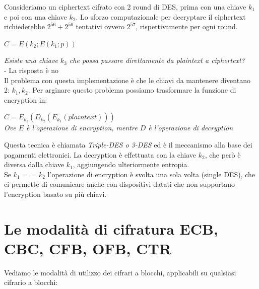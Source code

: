 \documentclass[11pt, oneside]{article}   	%
\begin{document}
Consideriamo un ciphertext cifrato con 2 round di DES, prima con una chiave $k_1$ e poi con una chiave $k_2$. Lo sforzo computazionale per decryptare il ciphertext richiederebbe $2^{56} + 2^{56}$ tentativi ovvero $2^{57}$, rispettivamente per ogni round.
\begin{center}
$C= E(k_2;E(k_1;p))$
\end{center}
\emph{Esiste una chiave $k_3$ che possa passare direttamente da plaintext a ciphertext?}\\
 - La risposta è no\\
 Il problema con questa implementazione è che le chiavi da mantenere diventano 2: $k_1, k_2$. Per arginare questo problema possiamo trasformare la funzione di encryption in:
 \begin{center}
 $C = E_{k_1}(D_{k_2}(E_{k_1}(plaintext)))$\\
 \emph{Ove $E$ è l'operazione di encryption, mentre $D$ è l'operazione di decryption}
 \end{center}
 Questa tecnica è chiamata \emph{Triple-DES o 3-DES} ed è il meccanismo alla base dei pagamenti elettronici. La decryption è effettuata con la chiave $k_2$, che però è diversa dalla chiave $k_1$, aggiungendo ulteriormente entropia.\\Se $k_1 == k_2$ l'operazione di encryption è svolta una sola volta (single DES), che ci permette di comunicare anche con dispositivi datati che non supportano l'encryption basato su più chiavi.
 


\section*{Le modalità di cifratura ECB, CBC, CFB, OFB, CTR}
Vediamo le modalità di utilizzo dei cifrari a blocchi, applicabili su qualsiasi cifrario a blocchi:
\end{document}
